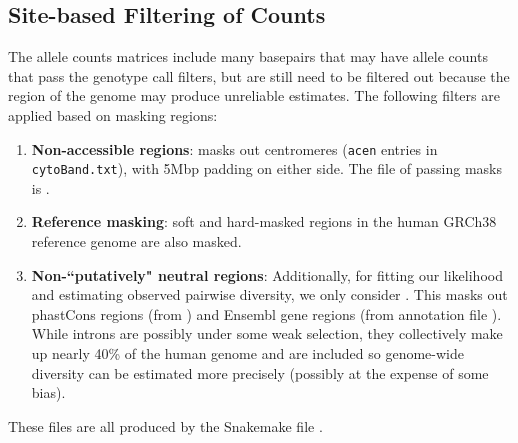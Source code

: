 \documentclass[11pt]{article}
\begin{document}
\subsection{Site-based Filtering of Counts}

The allele counts matrices include many basepairs that may have allele counts
that pass the genotype call filters, but are still need to be filtered out
because the region of the genome may produce unreliable estimates. The
following filters are applied based on masking regions:

\begin{enumerate}
  \item \textbf{Non-accessible regions}: masks out centromeres (\texttt{acen} entries in
    \texttt{cytoBand.txt}), with 5Mbp padding on either side. The file of
    passing masks is . 

  \item \textbf{Reference masking}: soft and hard-masked regions in the human GRCh38
    reference genome are also masked.

  \item \textbf{Non-``putatively" neutral regions}: Additionally, for fitting our
    likelihood and estimating observed pairwise diversity, we only consider .
    This masks out phastCons regions (from
    ) and Ensembl gene regions (from
    annotation file ).  While introns
    are possibly under some weak selection, they collectively make up nearly
    40\% of the human genome and are included so genome-wide diversity can be
    estimated more precisely (possibly at the expense of some bias).
\end{enumerate}

These files are all produced by the Snakemake file .
\end{document}
